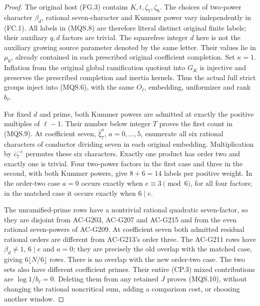 \begin{proof}
The original host (FG.3) contains $K,t,\zeta_7,\zeta_8$.
The choices of two-power character $\beta_d$, rational
seven-character and Kummer power vary independently
in (FC.1).  All labels in (MQS.8) are
therefore literal distinct original finite labels;
their auxiliary $q,d$ factors are trivial.  The
squarefree integer $d$ here is not the auxiliary
growing source parameter denoted by the same letter.
Their values lie in $\mu_6$, already contained in
each prescribed original coefficient completion.
Set $\kappa=1$.  Inflation from the original global
ramification quotient into $G_K$ is injective and
preserves the prescribed completion and inertia
kernels.  Thus the actual full strict groups inject
into (MQS.6), with the same $O_\ell$, embedding,
uniformizer and rank $b_\ell$.

For fixed $d$ and prime, both Kummer powers are
admitted at exactly the positive multiples of
$\ell-1$.  Their number below integer $T$ proves
the first count in (MQS.9).  At coefficient seven,
$\bar\xi_7^a$, $a=0,\ldots,5$, enumerate all six
rational characters of conductor dividing seven
in each original embedding.  Multiplication by
$\bar c_7^{-e}$ permutes these six characters.
Exactly one product has order two and exactly one
is trivial.  Four two-power factors in the first
case and three in the second, with both Kummer
powers, give $8+6=14$ labels per positive weight.
In the order-two case $a=0$ occurs exactly when
$e\equiv3\pmod6$, for all four factors; in the
matched case it occurs exactly when $6\mid e$.

The unramified-prime rows have a nontrivial rational
quadratic seven-factor, so they are disjoint from
AC-G203, AC-G207 and AC-G215 and from the even
rational seven-powers of AC-G209.
At coefficient seven both admitted residual rational
orders are different from AC-G213's order three.
The AC-G211 rows have $\beta_d\ne1$, $6\mid e$ and
$a=0$; they are precisely the old overlap with
the matched case, giving $6\lfloor N/6\rfloor$ rows.
There is no overlap with the new order-two case.
The two sets also have different coefficient
primes.  Their entire (CP.3) mixed contributions
are $\log1/b_\ell=0$.  Deleting them from any
retained $J$ proves (MQS.10), without changing the
rational noncritical sum, adding a comparison cost,
or choosing another window.
\end{proof}

